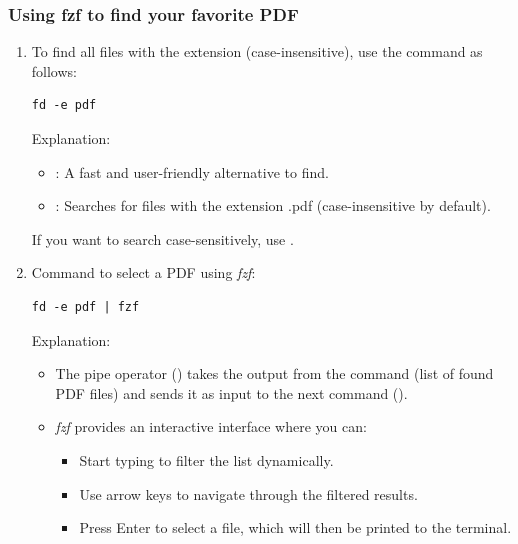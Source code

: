 \documentclass[titlepage]{article}
\begin{document}
\subsubsection{Using fzf to find your favorite PDF}
\begin{enumerate}
\item To find all files with the  extension (case-insensitive), use the  command as follows:
\begin{adjustwidth}{1cm}{1cm}
\begin{tcolorbox}[codebox]
\begin{lstlisting}[numbers=none]
fd -e pdf
\end{lstlisting}
\end{tcolorbox}
\end{adjustwidth}
Explanation:
\begin{itemize}
\item {}: A fast and user-friendly alternative to find.
\item {}: Searches for files with the extension .pdf (case-insensitive by default).
\end{itemize}
If you want to search case-sensitively, use .
\item Command to select a PDF using \textit{fzf}:
\begin{adjustwidth}{1cm}{1cm}
\begin{tcolorbox}[codebox]
\begin{lstlisting}[numbers=none]
fd -e pdf | fzf
\end{lstlisting}
\end{tcolorbox}
\end{adjustwidth}
Explanation:
\begin{itemize}
\item The pipe operator (\tcbox[inline]{|}) takes the output from the  command (list of found PDF files) and sends it as input to the next command ().
\item \textit{fzf} provides an interactive interface where you can:
\begin{itemize}
\item Start typing to filter the list dynamically.
\item Use arrow keys to navigate through the filtered results.
\item Press Enter to select a file, which will then be printed to the terminal.
\end{itemize}
\end{itemize}
\end{enumerate}
\end{document}
